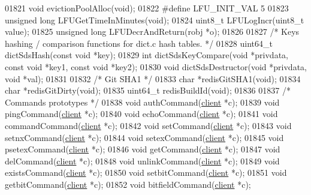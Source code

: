 \begin{DoxyCode}
{{{{{{{01821 \textcolor{keywordtype}{void} evictionPoolAlloc(\textcolor{keywordtype}{void});
01822 \textcolor{preprocessor}{#}\textcolor{preprocessor}{define} \textcolor{preprocessor}{LFU\_INIT\_VAL} 5
01823 \textcolor{keywordtype}{unsigned} \textcolor{keywordtype}{long} LFUGetTimeInMinutes(\textcolor{keywordtype}{void});
01824 uint8\_t LFULogIncr(uint8\_t value);
01825 \textcolor{keywordtype}{unsigned} \textcolor{keywordtype}{long} LFUDecrAndReturn(robj *o);
01826 
01827 \textcolor{comment}{/* Keys hashing / comparison functions for dict.c hash tables. */}
01828 uint64\_t dictSdsHash(\textcolor{keyword}{const} \textcolor{keywordtype}{void} *key);
01829 \textcolor{keywordtype}{int} dictSdsKeyCompare(\textcolor{keywordtype}{void} *privdata, \textcolor{keyword}{const} \textcolor{keywordtype}{void} *key1, \textcolor{keyword}{const} \textcolor{keywordtype}{void} *key2);
01830 \textcolor{keywordtype}{void} dictSdsDestructor(\textcolor{keywordtype}{void} *privdata, \textcolor{keywordtype}{void} *val);
01831 
01832 \textcolor{comment}{/* Git SHA1 */}
01833 \textcolor{keywordtype}{char} *redisGitSHA1(\textcolor{keywordtype}{void});
01834 \textcolor{keywordtype}{char} *redisGitDirty(\textcolor{keywordtype}{void});
01835 uint64\_t redisBuildId(\textcolor{keywordtype}{void});
01836 
01837 \textcolor{comment}{/* Commands prototypes */}
01838 \textcolor{keywordtype}{void} authCommand(\hyperlink{structclient}{client} *c);
01839 \textcolor{keywordtype}{void} pingCommand(\hyperlink{structclient}{client} *c);
01840 \textcolor{keywordtype}{void} echoCommand(\hyperlink{structclient}{client} *c);
01841 \textcolor{keywordtype}{void} commandCommand(\hyperlink{structclient}{client} *c);
01842 \textcolor{keywordtype}{void} setCommand(\hyperlink{structclient}{client} *c);
01843 \textcolor{keywordtype}{void} setnxCommand(\hyperlink{structclient}{client} *c);
01844 \textcolor{keywordtype}{void} setexCommand(\hyperlink{structclient}{client} *c);
01845 \textcolor{keywordtype}{void} psetexCommand(\hyperlink{structclient}{client} *c);
01846 \textcolor{keywordtype}{void} getCommand(\hyperlink{structclient}{client} *c);
01847 \textcolor{keywordtype}{void} delCommand(\hyperlink{structclient}{client} *c);
01848 \textcolor{keywordtype}{void} unlinkCommand(\hyperlink{structclient}{client} *c);
01849 \textcolor{keywordtype}{void} existsCommand(\hyperlink{structclient}{client} *c);
01850 \textcolor{keywordtype}{void} setbitCommand(\hyperlink{structclient}{client} *c);
01851 \textcolor{keywordtype}{void} getbitCommand(\hyperlink{structclient}{client} *c);
01852 \textcolor{keywordtype}{void} bitfieldCommand(\hyperlink{structclient}{client} *c);
}}}}}}}
\end{DoxyCode}
